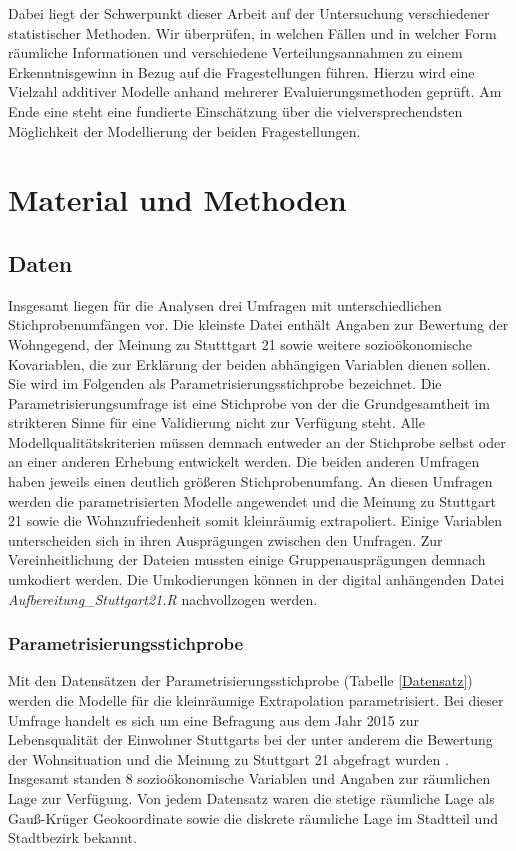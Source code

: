 \documentclass{Vorlage}
\begin{document}
Dabei liegt der Schwerpunkt dieser Arbeit auf der Untersuchung verschiedener statistischer Methoden. Wir überprüfen, in welchen Fällen und in welcher Form räumliche Informationen und verschiedene Verteilungsannahmen zu einem Erkenntnisgewinn in Bezug auf die Fragestellungen führen. Hierzu wird eine Vielzahl additiver Modelle anhand mehrerer Evaluierungsmethoden geprüft. Am Ende eine steht eine fundierte Einschätzung über die vielversprechendsten Möglichkeit der Modellierung der beiden Fragestellungen.\\
\newpage

\section{Material und Methoden}
\subsection{Daten}
Insgesamt liegen für die Analysen drei Umfragen mit unterschiedlichen Stichprobenumfängen vor. Die kleinste Datei 
enthält Angaben zur Bewertung der Wohngegend, der Meinung zu Stutttgart 21 sowie weitere sozioökonomische Kovariablen, 
die zur Erklärung der beiden abhängigen Variablen dienen sollen. Sie wird im Folgenden als 
Parametrisierungsstichprobe bezeichnet. Die Parametrisierungsumfrage ist eine Stichprobe von 
der die Grundgesamtheit im strikteren Sinne für eine Validierung nicht zur Verfügung steht. Alle Modellqualitätskriterien müssen 
demnach entweder an der Stichprobe selbst oder an einer anderen Erhebung entwickelt werden. Die beiden anderen 
Umfragen haben jeweils einen deutlich größeren Stichprobenumfang. An diesen Umfragen werden die parametrisierten 
Modelle angewendet und die Meinung zu Stuttgart 21 sowie die Wohnzufriedenheit somit kleinräumig extrapoliert. Einige 
Variablen unterscheiden sich in ihren Ausprägungen zwischen den Umfragen. Zur Vereinheitlichung der Dateien mussten 
einige Gruppenausprägungen demnach umkodiert werden. Die Umkodierungen können in der digital anhängenden Datei 
\textit{Aufbereitung\_Stuttgart21.R} nachvollzogen werden.

\subsubsection{Parametrisierungsstichprobe}
Mit den Datensätzen der Parametrisierungsstichprobe (Tabelle \ref{Datensatz}) werden die Modelle für die kleinräumige 
Extrapolation parametrisiert. Bei dieser Umfrage handelt es sich um eine Befragung aus dem Jahr 2015 zur Lebensqualität 
der Einwohner Stuttgarts bei der unter anderem die Bewertung der Wohnsituation und die Meinung zu Stuttgart 21 abgefragt 
wurden \cite{Stuttgart2015}. Insgesamt standen 8 sozioökonomische Variablen und Angaben zur räumlichen Lage zur 
Verfügung. Von jedem Datensatz waren die stetige räumliche Lage als Gauß-Krüger Geokoordinate sowie die diskrete räumliche 
Lage im Stadtteil und Stadtbezirk bekannt.\\
\end{document}
